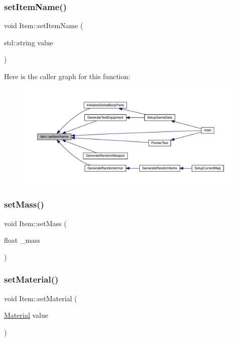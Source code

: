 \subsubsection{\texorpdfstring{set\+Item\+Name()}{setItemName()}}
{\footnotesize\ttfamily void Item\+::set\+Item\+Name (\begin{DoxyParamCaption}\item[{std\+::string}]{value }\end{DoxyParamCaption})}

Here is the caller graph for this function\+:
\nopagebreak
\begin{figure}[H]
\begin{center}
\leavevmode
\includegraphics[width=350pt]{class_item_ae8dd38d585a7795f134f6453feb1000e_icgraph}
\end{center}
\end{figure}
\mbox{\label{class_item_a3d6c15b2f0a37709541086df917aa761}} 
\subsubsection{\texorpdfstring{set\+Mass()}{setMass()}}
{\footnotesize\ttfamily void Item\+::set\+Mass (\begin{DoxyParamCaption}\item[{float}]{\+\_\+mass }\end{DoxyParamCaption})}

\mbox{\label{class_item_af8f9e1899f933fc2ae2cdee6c7de0a4e}} 
\subsubsection{\texorpdfstring{set\+Material()}{setMaterial()}}
{\footnotesize\ttfamily void Item\+::set\+Material (\begin{DoxyParamCaption}\item[{\mbox{\hyperlink{class_material}{Material}}}]{value }\end{DoxyParamCaption})}

